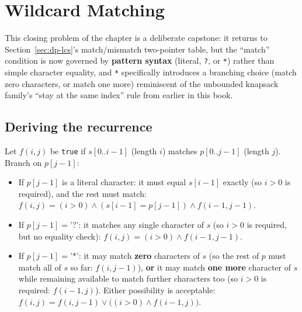 \section{Wildcard Matching}
\label{sec:dp-wildcard-matching}


\begin{patternbox}
This closing problem of the chapter is a deliberate capstone: it returns
to Section~\ref{sec:dp-lcs}'s match/mismatch two-pointer table, but the
``match'' condition is now governed by \textbf{pattern syntax}
(literal, \texttt{?}, or \texttt{*}) rather than simple character
equality, and \texttt{*} specifically introduces a branching choice
(match zero characters, or match one more) reminiscent of the unbounded
knapsack family's ``stay at the same index'' rule from earlier in this
book.
\end{patternbox}

\subsection*{Deriving the recurrence}

Let $f(i,j)$ be \texttt{true} if $s[0..i-1]$ (length $i$) matches
$p[0..j-1]$ (length $j$). Branch on $p[j-1]$:

\begin{itemize}
  \item If $p[j-1]$ is a literal character: it must equal $s[i-1]$
        exactly (so $i>0$ is required), and the rest must match:
        $f(i,j) = (i>0) \land (s[i{-}1]=p[j{-}1]) \land f(i{-}1,j{-}1)$.
  \item If $p[j-1] = \texttt{'?'}$: it matches any single character of
        $s$ (so $i>0$ is required, but no equality check):
        $f(i,j) = (i>0) \land f(i{-}1,j{-}1)$.
  \item If $p[j-1] = \texttt{'*'}$: it may match \textbf{zero}
        characters of $s$ (so the rest of $p$ must match all of $s$ so
        far: $f(i,j{-}1)$), \textbf{or} it may match \textbf{one more}
        character of $s$ while remaining available to match further
        characters too (so $i>0$ is required: $f(i{-}1,j)$). Either
        possibility is acceptable:
        $f(i,j) = f(i,j{-}1) \lor \big((i>0) \land f(i{-}1,j)\big)$.
\end{itemize}

